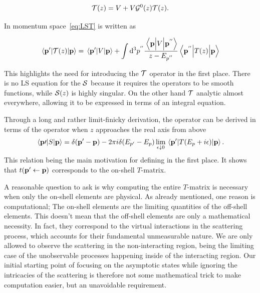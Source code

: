 \begin{equation}
  \label{eq:LST}
 \mathcal{T}(z) = V + V\mathcal{G}^{0}(z)\mathcal{T}(z).
\end{equation}

In momentum space~\eqref{eq:LST} is written as

\begin{equation*}
  \mel{\vb{p}^{\prime}}{\mathcal{T}(z)}{\vb{p}} = \mel{\vb{p}^{\prime}}{V}{\vb{p}}
  + \int\dd^{3}p^{''} \frac{\mel{\vb{p}}{V}{\vb{p^{''}}}}{z-E_{p^{''}}}\mel{\vb{p}^{''}}{T(z)}{\vb{p}}
\end{equation*}

This highlights the need for introducing the \(\mathcal{T}\) operator in the first
place. There is no LS equation for the \(\mathcal{S}\) because it requires the
operators to be smooth functions, while \(\mathcal{S}(z)\) is
highly singular. On the other hand \(\mathcal{T}\) analytic almost everywhere,
allowing it to be expressed in terms of an integral equation. 

Through a long and rather limit-finicky derivation, the  operator can be
derived in terms of the  operator when \(z\) approaches the real axis
from above
\begin{equation*}
  \mel{\vb{p}\prime}{S}{\vb{p}} = \delta(\vb{p}^{\prime}-\vb{p}) -2\pi i\delta(E_{p^{\prime}}-E_{p})
  \lim_{\epsilon\downarrow 0}\mel{\vb{p}^{\prime}}{T(E_{p}+i\epsilon)}{\vb{p}}.
\end{equation*}
This relation being the main motivation for defining  in the first
place. It shows that \(t(\vb{p}^{\prime}\leftarrow\vb{p})\) corresponds to the
on-shell \(T\)-matrix.

A reasonable question to ask is why computing the entire \(T\)-matrix is
necessary when only the on-shell elements are physical. As already mentioned,
one reason is computational; The on-shell elements are the limiting quantities
of the off-shell elements. This doesn't mean that the off-shell elements are
only a mathematical necessity. In fact, they correspond to the virtual
interactions in the scattering process, which accounts for their fundamental
unmeasurable nature. We are only allowed to observe the scattering in the
non-interacting region, being the limiting case of the unobservable processes
happening inside of the interacting region. Our initial starting point of
focusing on the asymptotic states while ignoring the intricacies of the
scattering is therefore not some mathematical trick to make computation easier,
but an unavoidable requirement.

